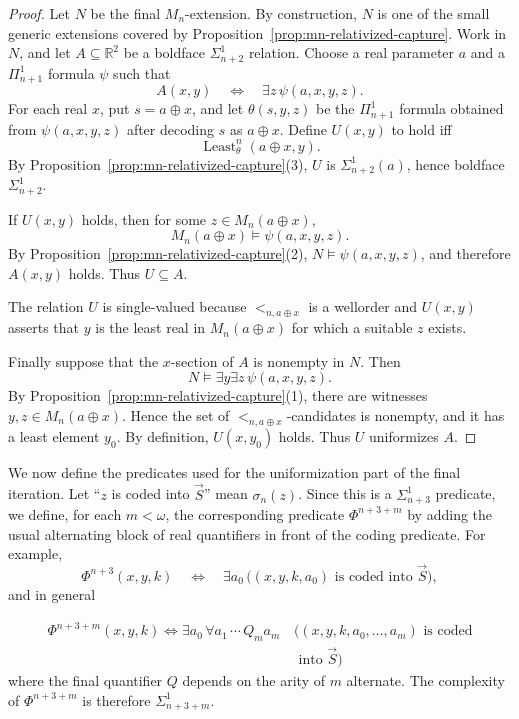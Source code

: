 \documentclass[a4paper,11pt]{article}
\begin{document}
\begin{proof}
Let $N$ be the final $M_n$-extension.  By construction, $N$ is one of the
small generic extensions covered by Proposition~\ref{prop:mn-relativized-capture}.
Work in $N$, and let $A\subseteq\mathbb R^2$ be a boldface
$\Sigma^1_{n+2}$ relation.  Choose a real parameter $a$ and a
$\Pi^1_{n+1}$ formula $\psi$ such that
\[
   A(x,y)
   \quad\Longleftrightarrow\quad
   \exists z\,\psi(a,x,y,z).
\]
For each real $x$, put $s=a\oplus x$, and let
$\theta(s,y,z)$ be the $\Pi^1_{n+1}$ formula obtained from
$\psi(a,x,y,z)$ after decoding $s$ as $a\oplus x$.  Define
$U(x,y)$ to hold iff
\[
   \operatorname{Least}^{n}_{\theta}(a\oplus x,y).
\]
By Proposition~\ref{prop:mn-relativized-capture}(3), $U$ is
$\Sigma^1_{n+2}(a)$, hence boldface $\Sigma^1_{n+2}$.

If $U(x,y)$ holds, then for some $z\in M_n(a\oplus x)$,
\[
   M_n(a\oplus x)\models\psi(a,x,y,z).
\]
By Proposition~\ref{prop:mn-relativized-capture}(2),
$N\models\psi(a,x,y,z)$, and therefore $A(x,y)$ holds.  Thus
$U\subseteq A$.

The relation $U$ is single-valued because $<_{n,a\oplus x}$ is a wellorder
and $U(x,y)$ asserts that $y$ is the least real in $M_n(a\oplus x)$ for which
a suitable $z$ exists.

Finally suppose that the $x$-section of $A$ is nonempty in $N$.  Then
\[
   N\models\exists y\exists z\,\psi(a,x,y,z).
\]
By Proposition~\ref{prop:mn-relativized-capture}(1), there are witnesses
$y,z\in M_n(a\oplus x)$.  Hence the set of $<_{n,a\oplus x}$-candidates is
nonempty, and it has a least element $y_0$.  By definition, $U(x,y_0)$ holds.
Thus $U$ uniformizes $A$.
\end{proof}

We now define the predicates used for the uniformization part of the final
iteration. Let ``$z$ is coded into $\vec S$'' mean $\sigma_n(z)$. Since this
is a $\Sigma^1_{n+3}$ predicate, we define, for each $m<\omega$, the
corresponding predicate $\Phi^{n+3+m}$ by adding the usual alternating block
of real quantifiers in front of the coding predicate. For example,
\[
\Phi^{n+3}(x,y,k)
\quad\Longleftrightarrow\quad
\exists a_0\,
\bigl((x,y,k,a_0)\text{ is coded into }\vec S\bigr),
\]
and in general

\begin{align*}
 \Phi^{n+3+m}(x,y,k) \Longleftrightarrow  
\exists a_0\,\forall a_1\,\cdots\,Q_m a_m\,
 & ((x,y,k,a_0,\ldots,a_m) \text{ is coded} \\& \text{ into } \vec{S} ) 
\end{align*}
where the final quantifier $Q$ depends on the arity of $m$ alternate.
The complexity of $\Phi^{n+3+m}$ is therefore $\Sigma^1_{n+3+m}$.
\end{document}
